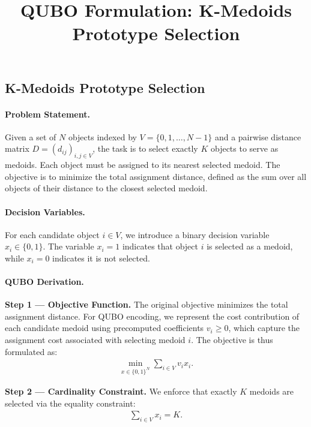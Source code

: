 \documentclass[12pt]{article}
\title{QUBO Formulation: K-Medoids Prototype Selection}
\date{}
\begin{document}
\maketitle

\subsection*{K-Medoids Prototype Selection}

\paragraph{Problem Statement.}
Given a set of $N$ objects indexed by $V = \{0, 1, \dots, N-1\}$ and a pairwise distance matrix $D = (d_{ij})_{i,j \in V}$, the task is to select exactly $K$ objects to serve as medoids. Each object must be assigned to its nearest selected medoid. The objective is to minimize the total assignment distance, defined as the sum over all objects of their distance to the closest selected medoid.

\paragraph{Decision Variables.}
For each candidate object $i \in V$, we introduce a binary decision variable $x_i \in \{0, 1\}$. The variable $x_i = 1$ indicates that object $i$ is selected as a medoid, while $x_i = 0$ indicates it is not selected.

\paragraph{QUBO Derivation.}
\textbf{Step 1 --- Objective Function.} The original objective minimizes the total assignment distance. For QUBO encoding, we represent the cost contribution of each candidate medoid using precomputed coefficients $v_i \geq 0$, which capture the assignment cost associated with selecting medoid $i$. The objective is thus formulated as:
\begin{align}
    \min_{x \in \{0,1\}^N} \sum_{i \in V} v_i x_i.
\end{align}

\textbf{Step 2 --- Cardinality Constraint.} We enforce that exactly $K$ medoids are selected via the equality constraint:
\begin{align}
    \sum_{i \in V} x_i = K.
\end{align}
\end{document}
